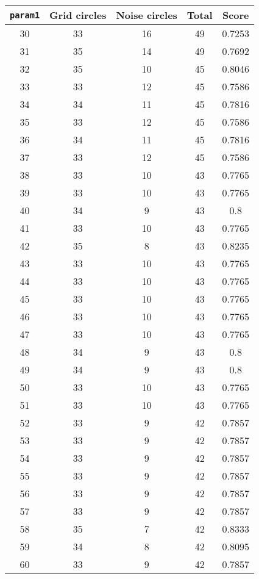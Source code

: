 \documentclass[letterpaper, 12pt]{article}
\begin{document}
\begin{longtable}{|c|c|c|c|c|}
\hline
\textbf{\texttt{param1}} & \textbf{Grid circles} & \textbf{Noise circles} & \textbf{Total} & \textbf{Score} \\
\hline
30 & 33 & 16 & 49 & 0.7253 \\
\hline
31 & 35 & 14 & 49 & 0.7692 \\
\hline
32 & 35 & 10 & 45 & 0.8046 \\
\hline
33 & 33 & 12 & 45 & 0.7586 \\
\hline
34 & 34 & 11 & 45 & 0.7816 \\
\hline
35 & 33 & 12 & 45 & 0.7586 \\
\hline
36 & 34 & 11 & 45 & 0.7816 \\
\hline
37 & 33 & 12 & 45 & 0.7586 \\
\hline
38 & 33 & 10 & 43 & 0.7765 \\
\hline
39 & 33 & 10 & 43 & 0.7765 \\
\hline
40 & 34 & 9 & 43 & 0.8 \\
\hline
41 & 33 & 10 & 43 & 0.7765 \\
\hline
42 & 35 & 8 & 43 & 0.8235 \\
\hline
43 & 33 & 10 & 43 & 0.7765 \\
\hline
44 & 33 & 10 & 43 & 0.7765 \\
\hline
45 & 33 & 10 & 43 & 0.7765 \\
\hline
46 & 33 & 10 & 43 & 0.7765 \\
\hline
47 & 33 & 10 & 43 & 0.7765 \\
\hline
48 & 34 & 9 & 43 & 0.8 \\
\hline
49 & 34 & 9 & 43 & 0.8 \\
\hline
50 & 33 & 10 & 43 & 0.7765 \\
\hline
51 & 33 & 10 & 43 & 0.7765 \\
\hline
52 & 33 & 9 & 42 & 0.7857 \\
\hline
53 & 33 & 9 & 42 & 0.7857 \\
\hline
54 & 33 & 9 & 42 & 0.7857 \\
\hline
55 & 33 & 9 & 42 & 0.7857 \\
\hline
56 & 33 & 9 & 42 & 0.7857 \\
\hline
57 & 33 & 9 & 42 & 0.7857 \\
\hline
58 & 35 & 7 & 42 & 0.8333 \\
\hline
59 & 34 & 8 & 42 & 0.8095 \\
\hline
60 & 33 & 9 & 42 & 0.7857 \\
\hline

\end{longtable}
\end{document}
